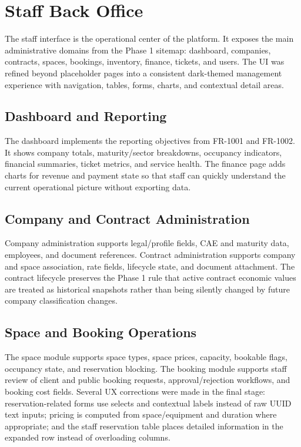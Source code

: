 \documentclass[12pt,a4paper]{report}
\begin{document}
\section{Staff Back Office}
\label{sec:staff-backoffice}

The staff interface is the operational center of the platform. It exposes the
main administrative domains from the Phase 1 sitemap: dashboard, companies,
contracts, spaces, bookings, inventory, finance, tickets, and users. The UI was
refined beyond placeholder pages into a consistent dark-themed management
experience with navigation, tables, forms, charts, and contextual detail areas.

\subsection{Dashboard and Reporting}
\label{subsec:dashboard-reporting}

The dashboard implements the reporting objectives from FR-1001 and FR-1002. It
shows company totals, maturity/sector breakdowns, occupancy indicators,
financial summaries, ticket metrics, and service health. The finance page adds
charts for revenue and payment state so that staff can quickly understand the
current operational picture without exporting data.

\subsection{Company and Contract Administration}
\label{subsec:company-contract}

Company administration supports legal/profile fields, CAE and maturity data,
employees, and document references. Contract administration supports company and
space association, rate fields, lifecycle state, and document attachment. The
contract lifecycle preserves the Phase 1 rule that active contract economic
values are treated as historical snapshots rather than being silently changed by
future company classification changes.

\subsection{Space and Booking Operations}
\label{subsec:space-booking}

The space module supports space types, space prices, capacity, bookable flags,
occupancy state, and reservation blocking. The booking module supports staff
review of client and public booking requests, approval/rejection workflows, and
booking cost fields. Several UX corrections were made in the final stage:
reservation-related forms use selects and contextual labels instead of raw UUID
text inputs; pricing is computed from space/equipment and duration where
appropriate; and the staff reservation table places detailed information in the
expanded row instead of overloading columns.
\end{document}
